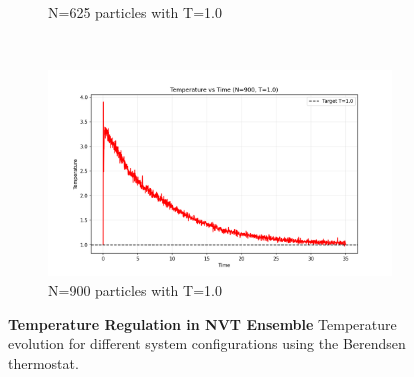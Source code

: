 \begin{figure}[H]
\begin{subfigure}{0.5\textwidth}
		\caption{N=625 particles with T=1.0}
		\label{sfig:nvt_temp_N625_T10}
	\end{subfigure}%
	~
	\begin{subfigure}{0.5\textwidth}
		\includegraphics[width=\textwidth]{media/temp_N900_T1.0.png}
		\caption{N=900 particles with T=1.0}
		\label{sfig:nvt_temp_N900_T10}
	\end{subfigure}%
	\caption{\textbf{Temperature Regulation in NVT Ensemble}
		Temperature evolution for different system configurations using the Berendsen thermostat.}
	\label{fig:nvt_temperature}
\end{figure}
